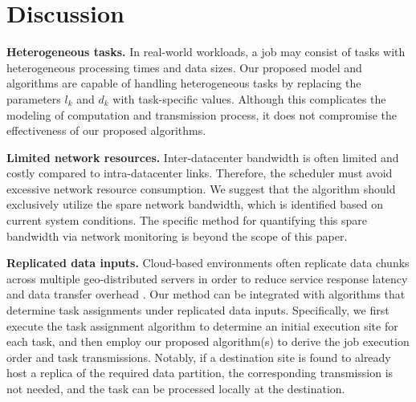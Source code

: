 \section{Discussion}
\textbf{Heterogeneous tasks.} In real-world workloads, a job may consist of tasks with heterogeneous processing times and data sizes. Our proposed model and algorithms are capable of handling heterogeneous tasks by replacing the parameters $l_k$ and $d_k$ with task-specific values. Although this complicates the modeling of computation and transmission process, it does not compromise the effectiveness of our proposed algorithms.

\textbf{Limited network resources.} Inter-datacenter bandwidth is often limited and costly compared to intra-datacenter links. Therefore, the scheduler must avoid excessive network resource consumption. We suggest that the algorithm should exclusively utilize the spare network bandwidth, which is identified based on current system conditions. The specific method for quantifying this spare bandwidth via network monitoring is beyond the scope of this paper.

\textbf{Replicated data inputs.} Cloud-based environments often replicate data chunks across multiple geo-distributed servers in order to reduce service response latency and data transfer overhead \cite{guan2022task, zhao2025data}. Our method can be integrated with algorithms that determine task assignments under replicated data inputs. Specifically, we first execute the task assignment algorithm to determine an initial execution site for each task, and then employ our proposed algorithm(s) to derive the job execution order and task transmissions. Notably, if a destination site is found to already host a replica of the required data partition, the corresponding transmission is not needed, and the task can be processed locally at the destination.

